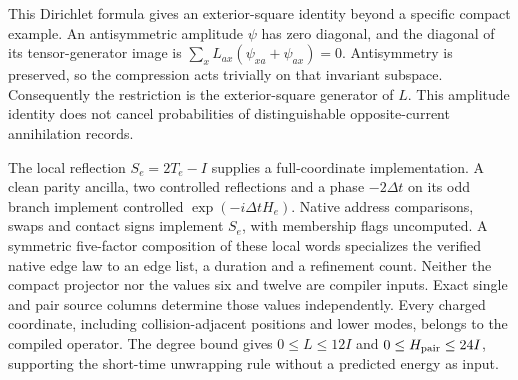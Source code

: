 This Dirichlet formula gives an exterior-square identity beyond a specific
compact example. An antisymmetric amplitude $\psi$ has zero diagonal,
and the diagonal of its tensor-generator image is
$\sum_xL_{ax}(\psi_{xa}+\psi_{ax})=0$. Antisymmetry is preserved, so
the compression acts trivially on that invariant subspace. Consequently
the restriction is the exterior-square generator of $L$. This amplitude
identity does not cancel probabilities of distinguishable opposite-current
annihilation records.

The local reflection $S_e=2T_e-I$ supplies a full-coordinate implementation.
A clean parity ancilla, two controlled reflections and a phase
$-2\Delta t$ on its odd branch implement controlled
$\exp(-i\Delta tH_e)$. Native address comparisons, swaps and contact
signs implement $S_e$, with membership flags uncomputed. A symmetric
five-factor composition of these local words specializes the verified
native edge law to an edge list, a duration and a refinement count.
Neither the compact projector nor
the values six and twelve are compiler inputs. Exact single and pair
source columns determine those values independently. Every charged
coordinate, including collision-adjacent positions and lower modes,
belongs to the compiled operator. The degree bound gives
$0\leq L\leq12I$ and $0\leq H_{\rm pair}\leq24I$, supporting the
short-time unwrapping rule without a predicted energy as input.

